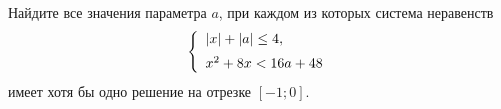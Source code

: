 \begin{ex}
	\begin{condition}
		Найдите все значения параметра \( a \), при каждом из которых система неравенств
		\[ \left\{
		\begin{array}{l}
			|x|+|a|\le4,\vspace{2mm}\\
			x^2+8x<16a+48
		\end{array}
		\right. \]
		имеет хотя бы одно решение на отрезке \( [-1;0] \).
	\end{condition}
\end{ex}